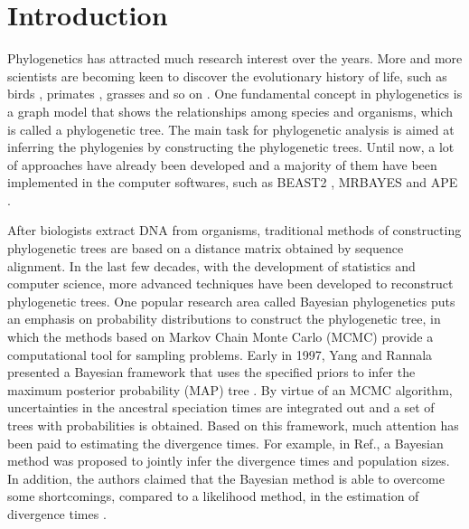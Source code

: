 \documentclass{bmcart}
\begin{document}

\section*{Introduction}
Phylogenetics has attracted much research interest over the years. More and more scientists are becoming keen to discover the evolutionary history of life, such as birds \cite{hackett2008phylogenomic}, primates \cite{szalay2013evolutionary}, grasses \cite{kellogg2001evolutionary} and so on \cite{sawabe2007inferring,garnery1992evolutionary}. One fundamental concept in phylogenetics is a graph model that shows the relationships among species and organisms, which is called a phylogenetic tree. The main task for phylogenetic analysis is aimed at inferring the phylogenies by constructing the phylogenetic trees. Until now, a lot of approaches have already been developed and a majority of them have been implemented in the computer softwares, such as BEAST2 \cite{drummond2007beast, bouckaert2014beast} , MRBAYES \cite{huelsenbeck2001mrbayes} and APE \cite{paradis2004ape}.

After biologists extract DNA from organisms, traditional methods of constructing phylogenetic trees are based on a distance matrix obtained by sequence alignment. In the last few decades, with the development of statistics and computer science, more advanced techniques have been developed to reconstruct phylogenetic trees. One popular research area called Bayesian phylogenetics puts an emphasis on probability distributions to construct the phylogenetic tree, in which the methods based on Markov Chain Monte Carlo (MCMC) provide a computational tool for sampling problems. Early in 1997, Yang and Rannala presented a Bayesian framework that uses the specified priors to infer the maximum posterior probability (MAP) tree \cite{yang1997bayesian}. By virtue of an MCMC algorithm, uncertainties in the ancestral speciation times are integrated out and a set of trees with probabilities is obtained. Based on this framework, much attention has been paid to estimating the divergence times. For example, in Ref.\cite{rannala2003bayes}, a Bayesian method was proposed to jointly infer the divergence times and population sizes. In addition, the authors claimed that the Bayesian method is able to overcome some shortcomings, compared to a likelihood method, in the estimation of divergence times \cite{yang2003comparison}. 
\end{document}

